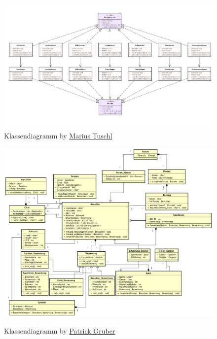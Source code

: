 	\begin{figure}[h!]
		\centering
		\includegraphics[width = \linewidth]{docs/5_Klassendiagramme/Marius/ServiceLayer.pdf}
		\caption*{Klassendiagramm by \hyperref[person:MariusTuschl]{Marius Tuschl}}
	\end{figure}

\begin{figure}[h!]
	\centering
	\includegraphics[width = \linewidth]{docs/5_Klassendiagramme/Patrick/Klassendiagramm.png}
	\label{fig:ClassDia_Patrick}
	\caption*{Klassendiagramm by \hyperref[person:PatrickGruber]{Patrick Gruber}}
\end{figure}